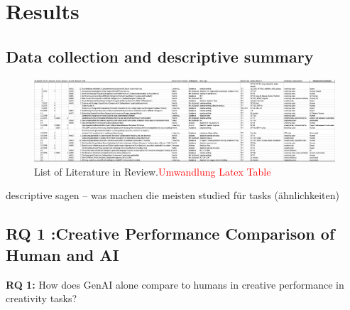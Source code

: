 \documentclass[manuscript, screen, review, acmsmall, anonymous]{acmart}
\newcommand{\TODO}[1]{\textcolor{red}{#1}}
\begin{document}
\newpage

\section{Results}
\label{sec:Results}

\subsection{Data collection and descriptive summary}
\label{sec:Results}

\begin{figure}[H]
  \centering
  \includegraphics[width=\linewidth]{List_included_Paper.png}
  \caption{List of Literature in Review.\TODO{Umwandlung Latex Table}}
  \label{fig:TablePapers}
\end{figure}

descriptive sagen -- was machen die meisten studied für tasks (ähnlichkeiten) 

\subsection{RQ 1 :Creative Performance Comparison of Human and AI}
\label{sec:CreativePerformanceComparisonOfHumanAndAI}
\textbf{RQ 1:} How does GenAI alone compare to humans in creative performance in creativity tasks? \\
\end{document}
